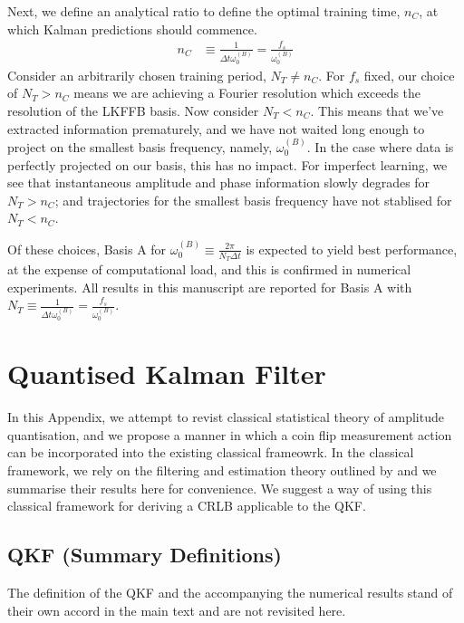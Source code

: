 Next, we define an analytical ratio to define the optimal training time, $n_C$, at which Kalman predictions should commence. 
\begin{align}
n_C &\equiv \frac{1}{\Delta t \omega_0^{(B)}} = \frac{f_s}{\omega_0^{(B)}} \label{eqn:sec:ap_liska_fixedbasis_nC}
\end{align}
Consider an arbitrarily chosen training period, $N_T \neq n_C $.  For $f_s$ fixed, our choice of $N_T > n_C $ means we are achieving a Fourier resolution which exceeds the resolution of the LKFFB basis. Now consider $N_T< n_C$. This means that we've extracted information prematurely, and we have not waited long enough to project on the smallest basis frequency, namely, $\omega_0^{(B)}$.  In the case where data is perfectly projected on our basis, this has no impact. For imperfect learning, we see that instantaneous amplitude and phase information slowly degrades for $N_T > n_C$; and trajectories for the smallest basis frequency have not stablised for $N_T < n_C$. 

Of these choices, Basis A for $\omega_0^{(B)} \equiv \frac{2\pi}{N_T \Delta t}$ is expected to yield best performance, at the expense of computational load, and this is confirmed in numerical experiments. All results in this manuscript are reported for Basis A with $N_T \equiv \frac{1}{\Delta t \omega_0^{(B)}} = \frac{f_s}{\omega_0^{(B)}} $.




\newpage
\section{Quantised Kalman Filter \label{sec:app:qkf}}

In this Appendix, we attempt to revist classical statistical theory of amplitude quantisation, and we propose a manner in which a coin flip measurement action can be incorporated into the existing classical frameowrk.  In the classical framework, we rely on the filtering and estimation theory outlined by \cite{karlsson2005} and we summarise their results here for convenience. We suggest a way of using this classical framework for deriving a CRLB applicable to the QKF. 

\subsection{QKF (Summary Definitions)}
The definition of the QKF and the accompanying the numerical results stand of their own accord in the main text and are not revisited here. 

